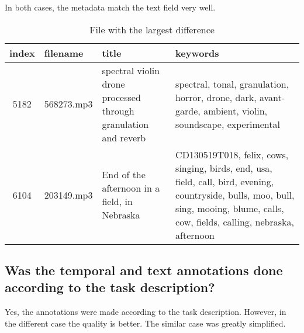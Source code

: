 In both cases, the metadata match the text field very well.

\begin{table}[h]
  \caption{File with the largest difference}
  \label{tab:metadata match}
  \centering
  \begin{tabular}{clp{4cm}p{8cm}}
    \toprule
    index & filename & title & keywords \\
    \midrule
    5182 & 568273.mp3 & spectral violin drone processed through granulation and reverb & spectral, tonal, granulation, horror, drone, dark, avant-garde, ambient, violin, soundscape, experimental \\
    6104 & 203149.mp3 & End of the afternoon in a field, in Nebraska & CD130519T018, felix, cows, singing, birds, end, usa, field, call, bird, evening, countryside, bulls, moo, bull, sing, mooing, blume, calls, cow, fields, calling, nebraska, afternoon \\
    \bottomrule
  \end{tabular}
\end{table}

\subsection{Was the temporal and text annotations done according to the task description?}
\label{sec:Case Study:c}

Yes, the annotations were made according to the task description. 
However, in the different case the quality is better. 
The similar case was greatly simplified.



